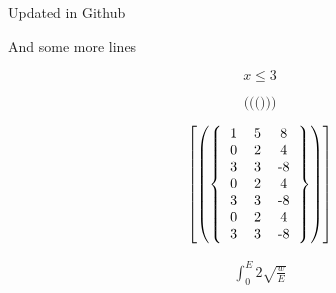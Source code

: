 \documentclass{article}
\begin{document}


Updated in Github

And some more lines

\[ x \le 3 \]

\[
\big(
\Big(
\Bigg(
\big)
\Big)
\Bigg)
\]

\[ 
\left [
\left (
\left \{
  \begin{tabular}{ccc}
  1 & 5 & 8 \\
  0 & 2 & 4 \\
  3 & 3 & -8 \\
  0 & 2 & 4 \\
  3 & 3 & -8 \\
  0 & 2 & 4 \\
  3 & 3 & -8 
  \end{tabular}
\right \}
\right )
\right ]
\]

\begin{align} 
    \int_0^E 2 \sqrt{ \frac{w}{E} } 
\end{align}
\end{document}
